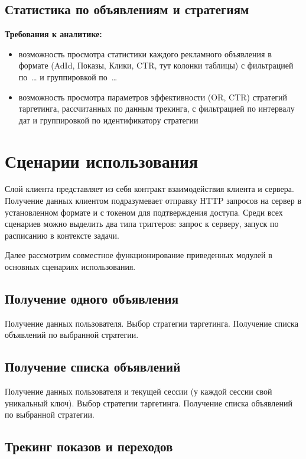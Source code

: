 \documentclass[times]{itmo-student-thesis}
\begin{document}
\subsection{Статистика по объявлениям и стратегиям}

\textbf{Требования к аналитике:}
\begin{itemize}
	\item возможность просмотра статистики каждого рекламного объявления в формате (AdId, Показы, Клики, CTR, тут колонки таблицы) с фильтрацией по … и группировкой по …
	\item возможность просмотра параметров эффективности (OR, CTR) стратегий таргетинга, рассчитанных по данным трекинга, с фильтрацией по интервалу дат и группировкой по идентификатору стратегии
\end{itemize}


\section{Сценарии использования}

Слой клиента представляет из себя контракт взаимодействия клиента и сервера. Получение данных клиентом подразумевает отправку HTTP запросов  на сервер в установленном формате и с токеном для подтверждения доступа. Среди всех сценариев можно выделить два типа триггеров: запрос к серверу, запуск по расписанию в контексте задачи.

Далее рассмотрим совместное функционирование приведенных модулей в основных сценариях использования.

\subsection{Получение одного объявления}

Получение данных пользователя. 
Выбор стратегии таргетинга. 
Получение списка объявлений по выбранной стратегии.

\subsection{Получение списка объявлений}

Получение данных пользователя и текущей сессии (у каждой сессии свой уникальный ключ). 
Выбор стратегии таргетинга. 
Получение списка объявлений по выбранной стратегии.

\subsection{Трекинг показов и переходов}
\end{document}
